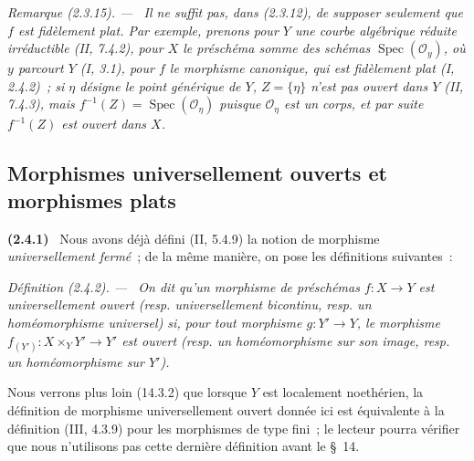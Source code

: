 \documentclass[10pt,oneside]{book}
\newcommand{\oldpage}[2][]{%
  \setcounter{footnote}{0}%
  \marginpar{\scriptsize\textbf{#1}~|~#2}\ignorespaces}
\newenvironment{env}[1][]{\par\medskip\noindent\textbf{(#1)}\ }{\par}
\newenvironment{definition}[1][]{%
  \par\medskip\noindent\itshape Définition (#1). ---\ }{\par}
\newenvironment{remark}[1][]{%
  \par\medskip\noindent\itshape Remarque (#1). ---\ }{\par}
\begin{document}
\begin{remark}[2.3.15]
\label{IV.2.3.15-fr}
Il ne suffit pas, dans (2.3.12), de supposer seulement que $f$ est fidèlement
plat. Par exemple, prenons pour $Y$ une courbe algébrique réduite irréductible
\oldpage[IV-2]{19}
(II, 7.4.2), pour $X$ le préschéma somme des schémas
$\operatorname{Spec}(\mathcal O_y)$, où $y$ parcourt $Y$ (I, 3.1), pour $f$ le
morphisme canonique, qui est fidèlement plat (I, 2.4.2)~; si $\eta$ désigne le
point générique de $Y$, $Z=\{\eta\}$ n'est pas ouvert dans $Y$ (II, 7.4.3),
mais $f^{-1}(Z)=\operatorname{Spec}(\mathcal O_\eta)$ puisque
$\mathcal O_\eta$ est un corps, et par suite $f^{-1}(Z)$ est ouvert dans $X$.
\end{remark}

\subsection{Morphismes universellement ouverts et morphismes plats}

\begin{env}[2.4.1]
\label{IV.2.4.1-fr}
Nous avons déjà défini (II, 5.4.9) la notion de morphisme
\emph{universellement fermé}~; de la même manière, on pose les définitions
suivantes~:
\end{env}

\begin{definition}[2.4.2]
\label{IV.2.4.2-fr}
On dit qu'un morphisme de préschémas $f:X\to Y$ est \emph{universellement
ouvert} (resp. \emph{universellement bicontinu}, resp. un
\emph{homéomorphisme universel}) si, pour tout morphisme $g:Y'\to Y$, le
morphisme $f_{(Y')}:X\times_Y Y'\to Y'$ est ouvert (resp. un homéomorphisme
sur son image, resp. un homéomorphisme sur $Y'$).
\end{definition}

Nous verrons plus loin (14.3.2) que lorsque $Y$ est localement noethérien, la
définition de morphisme universellement ouvert donnée ici est équivalente à la
définition (III, 4.3.9) pour les morphismes de type fini~; le lecteur pourra
vérifier que nous n'utilisons pas cette dernière définition avant le \S~14.
\end{document}
